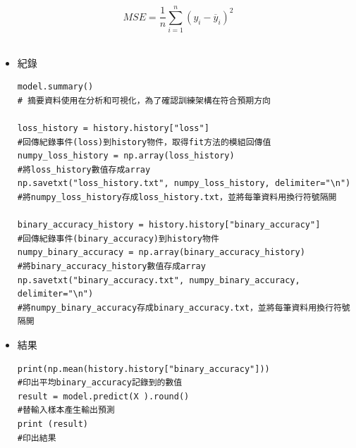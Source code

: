 \documentclass[12pt, a4paper]{article}
\begin{document}
$$MSE=\frac{1}{n}\sum^{n} _{i=1}(y_i-\overline{y}_i )^2$$\\
\begin{itemize}
\item 紀錄\\
\begin{lstlisting}
model.summary()
# 摘要資料使用在分析和可視化，為了確認訓練架構在符合預期方向

loss_history = history.history["loss"] 
#回傳紀錄事件(loss)到history物件，取得fit方法的模組回傳值
numpy_loss_history = np.array(loss_history) 
#將loss_history數值存成array
np.savetxt("loss_history.txt", numpy_loss_history, delimiter="\n")
#將numpy_loss_history存成loss_history.txt，並將每筆資料用換行符號隔開

binary_accuracy_history = history.history["binary_accuracy"]
#回傳紀錄事件(binary_accuracy)到history物件
numpy_binary_accuracy = np.array(binary_accuracy_history) 
#將binary_accuracy_history數值存成array
np.savetxt("binary_accuracy.txt", numpy_binary_accuracy, delimiter="\n")
#將numpy_binary_accuracy存成binary_accuracy.txt，並將每筆資料用換行符號隔開
\end{lstlisting}
\end{itemize}
\begin{itemize}
\item 結果
\begin{lstlisting}
print(np.mean(history.history["binary_accuracy"])) 
#印出平均binary_accuracy記錄到的數值
result = model.predict(X ).round() 
#替輸入樣本產生輸出預測
print (result) 
#印出結果
\end{lstlisting}
\end{itemize}
\end{document}
